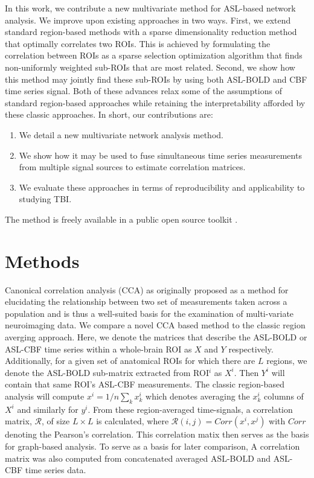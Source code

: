\documentclass{llncs}
\begin{document}
In this work, we contribute a new multivariate method for ASL-based network analysis.  We improve upon existing approaches in two ways.  First, we extend standard region-based methods with a sparse dimensionality reduction method that optimally correlates two ROIs.  This is achieved by formulating the correlation between ROIs as a sparse selection optimization algorithm that finds non-uniformly weighted sub-ROIs that are most related.  Second, we show how this method may jointly find these sub-ROIs by using both ASL-BOLD and CBF time series signal.  Both of these advances relax some of the assumptions of standard region-based approaches while retaining the interpretability afforded by these classic approaches.  In short, our contributions are: 
\begin{enumerate}
\item We detail a new multivariate network analysis method.
\item We show how it may be used to fuse simultaneous time series measurements from multiple signal sources to estimate correlation matrices.
\item We evaluate these approaches in terms of reproducibility and applicability to studying TBI. 
\end{enumerate}
The method is freely available in a public open source toolkit \cite{anon}.


\section{Methods}
Canonical correlation analysis (CCA) as originally proposed as a method for elucidating the relationship between two set of measurements taken across a population \cite{Hotelling1936} and is thus a well-suited basis for the examination of multi-variate neuroimaging data.  We compare a novel CCA based method to the classic region averging approach. Here, we denote the matrices that describe the ASL-BOLD or ASL-CBF time series within a whole-brain ROI as $X$ and $Y$ respectively.  Additionally, for a given set of anatomical ROIs for which there are $L$ regions, we denote the ASL-BOLD sub-matrix extracted from ROI$^i$ as $X^i$.  Then $Y^i$ will contain that same ROI's ASL-CBF measurements. The classic region-based analysis will compute $x^i = 1/n \sum_k x^i_k$ which denotes averaging the $x^i_k$ columns of $X^i$ and similarly for $y^i$.  From these region-averaged time-signals, a correlation matrix, $\mathcal{R}$, of size $L \times L$ is calculated, where $\mathcal{R}(i,j)=Corr(x^i,x^j)$ with $Corr$ denoting the Pearson's correlation. This correlation matix then serves as the basis for graph-based analysis. To serve as a basis for later comparison, A correlation matrix was also computed from concatenated averaged ASL-BOLD and ASL-CBF time series data.
\end{document}
